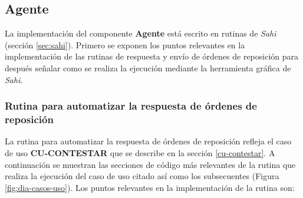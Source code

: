 \subsection{Agente}\label{sec:agente}
La implementación del componente \textbf{Agente} está escrito en rutinas de \textit{Sahi} (sección \ref{sec:sahi}). Primero se exponen los puntos relevantes en la implementación de las rutinas de respuesta y envío de órdenes de reposición para después señalar como se realiza la ejecución mediante la herramienta gráfica de \textit{Sahi}.

\subsubsection{Rutina para automatizar la respuesta de órdenes de reposición}\label{sec:aut-contestar}
La rutina para automatizar la respuesta de órdenes de reposición refleja el caso de uso \textbf{CU-CONTESTAR} que se describe en la sección \ref{cu-contestar}. A continuación se muestran las secciones de código más relevantes de la rutina que realiza la ejecución del caso de uso citado así como los subsecuentes (Figura \ref{fig:dia-casos-uso}). Los puntos relevantes en la implementación de la rutina son:
